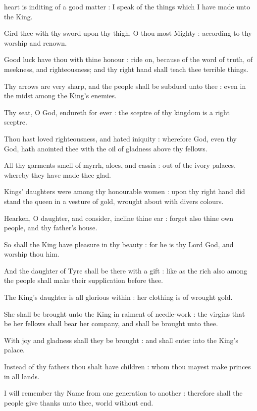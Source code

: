  heart is inditing of a good matter : I speak of the things which I have made unto the King.\par
{}
Gird thee with thy sword upon thy thigh, O thou most Mighty : according to thy worship and renown.\par
{}Good luck have thou with thine honour : ride on, because of the word of truth, of meekness, and righteousness; and thy right hand shall teach thee terrible things.\par
{}Thy arrows are very sharp, and the people shall be subdued unto thee : even in the midst among the King's enemies.\par
{}Thy seat, O God, endureth for ever : the sceptre of thy kingdom is a right sceptre.\par
{}Thou hast loved righteousness, and hated iniquity : wherefore God, even thy God, hath anointed thee with the oil of gladness above thy fellows.\par
{}All thy garments smell of myrrh, aloes, and cassia : out of the ivory palaces, whereby they have made thee glad.\par
{}Kings' daughters were among thy honourable women : upon thy right hand did stand the queen in a vesture of gold, wrought about with divers colours.\par
{}Hearken, O daughter, and consider, incline thine ear : forget also thine own people, and thy father's house.\par
{}So shall the King have pleasure in thy beauty : for he is thy Lord God, and worship thou him.\par
{}And the daughter of Tyre shall be there with a gift : like as the rich also among the people shall make their supplication before thee.\par
{}The King's daughter is all glorious within : her clothing is of wrought gold.\par
{}She shall be brought unto the King in raiment of needle-work : the virgins that be her fellows shall bear her company, and shall be brought unto thee.\par
{}With joy and gladness shall they be brought : and shall enter into the King's palace.\par
{}Instead of thy fathers thou shalt have children : whom thou mayest make princes in all lands.\par
{}I will remember thy Name from one generation to another : therefore shall the people give thanks unto thee, world without end.\par

